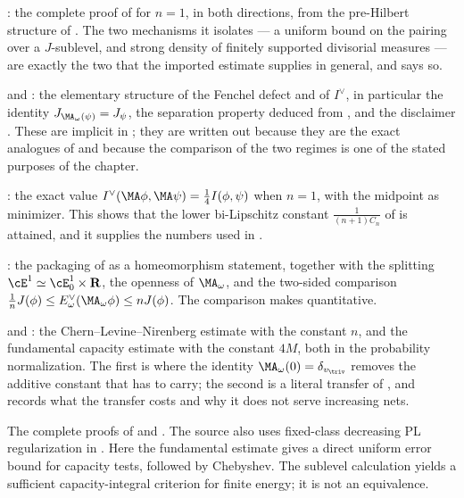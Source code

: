 : the complete proof of
 for $n=1$, in both directions, from
the pre-Hilbert structure of .  The two
mechanisms it isolates --- a uniform bound on the pairing over a
$J$-sublevel, and strong density of finitely supported divisorial
measures --- are exactly the two that the imported estimate supplies in
general, and  says so.

 and
: the elementary structure of the Fenchel
defect and of $I^\vee$, in particular the identity
$J_{\MA_\omega(\psi)}=J_\psi$, the separation property deduced from
, and the disclaimer
.  These are implicit in
\cite[\S10]{BJ22}; they are written out because they are the exact
analogues of
 and because the
comparison of the two regimes is one of the stated purposes of the
chapter.

: the exact value
$I^\vee(\MA\phi,\MA\psi)=\tfrac14I(\phi,\psi)$ when $n=1$, with the
midpoint as minimizer.  This shows that the lower bi-Lipschitz constant
$\frac1{(n+1)C_n}$ of  is attained, and
it supplies the numbers used in .

: the packaging of
 as a homeomorphism statement, together
with the splitting $\cE^1\simeq\cE^1_0\times\mathbf R$, the openness of
$\MA_\omega$, and the two-sided comparison
$\frac1nJ(\phi)\le E^\vee_\omega(\MA_\omega\phi)\le nJ(\phi)$.  The
comparison makes  quantitative.

 and : the
Chern--Levine--Nirenberg estimate with the constant $n$, and the
fundamental capacity estimate with the constant $4M$, both in the
probability normalization.  The first is where the identity
$\MA_\omega(0)=\delta_{v_{\triv}}$ removes the additive constant that
 has to carry; the second is a literal
transfer of , and
 records what the transfer costs and
why it does not serve increasing nets.

The complete proofs of  and
.  The source also uses fixed-class decreasing PL regularization in
\cite[Theorem~13.9]{BJ22}. Here the fundamental estimate gives a
direct uniform error bound for capacity tests, followed by Chebyshev.
The sublevel calculation yields a sufficient capacity-integral
criterion for finite energy; it is not an equivalence.

